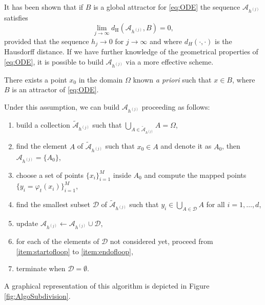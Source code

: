 \documentclass{siamart1116}
\numberwithin{theorem}{section}
\renewcommand{\phi}{\varphi}
\begin{document}
It has been shown that if $B$ is a global attractor for \eqref{eq:ODE} the sequence $\mathcal{A}_{h^{(j)}}$ satisfies
\begin{equation}
	\lim_{j\to\infty} d_{\text{H}}(\mathcal{A}_{h^{(j)}}, B) = 0,
\end{equation}
provided that the sequence $h_{j} \to 0$ for $j \to \infty$ and where $d_H(\cdot, \cdot)$ is the Hausdorff distance. If we have further knowledge of the geometrical properties of \eqref{eq:ODE}, it is possible to build $\mathcal{A}_{h^{(j)}}$ via a more effective scheme. 
\begin{assumption}\label{ass:knownX0} There exists a point $x_0$ in the domain $\Omega$ known \textit{a priori} such that $x \in B$, where $B$ is an attractor of \eqref{eq:ODE}.
\end{assumption}
Under this assumption, we can build $\mathcal{A}_{h^{(j)}}$ proceeding as follows:
\begin{enumerate}
	\item build a collection $\tilde{\mathcal{A}}_{h^{(j)}}$ such that $\bigcup_{A \in \tilde{\mathcal{A}}_{h^{(j)}}} A = \Omega$,
	\item find the element $A$ of $\tilde{\mathcal{A}}_{h^{(j)}}$ such that $x_0 \in A$ and denote it as $A_0$, then $\mathcal{A}_{h^{(j)}} = \{A_0\}$,
	\item\label{item:startofloop} choose a set of points $\{x_i\}_{i=1}^M$ inside $A_0$ and compute the mapped points $\{y_i = \phi_t(x_i)\}_{i=1}^M$,
	\item find the smallest subset $\mathcal{D}$ of $\tilde{\mathcal{A}}_{h^{(j)}}$ such that $y_i \in \bigcup_{A \in \mathcal{D}} A$  for all $i = 1, \ldots, d$,
	\item\label{item:endofloop} update $\mathcal{A}_{h^{(j)}} \leftarrow \mathcal{A}_{h^{(j)}} \cup \mathcal{D}$,
	\item for each of the elements of $\mathcal{D}$ not considered yet, proceed from \ref{item:startofloop} to \ref{item:endofloop},
	\item terminate when $\mathcal{D} = \emptyset$.
\end{enumerate}
A graphical representation of this algorithm is depicted in Figure \ref{fig:AlgoSubdivision}. 
\end{document}
